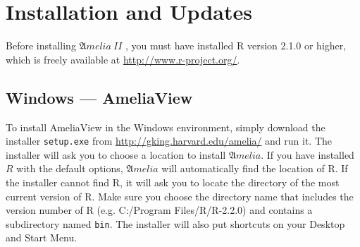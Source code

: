 \documentclass[12pt,titlepage]{article}
\newcommand{\AmeliaII}{\ensuremath{\mathfrak Amelia~II} }
\begin{document}

\section{Installation and Updates}
\label{sec:install}

Before installing \AmeliaII, you must have installed R version 2.1.0
or higher, which is freely available at
\url{http://www.r-project.org/}.  
\subsection{Windows --- AmeliaView}
\label{sec:win-install}
To install AmeliaView in the Windows environment, simply download the
installer \texttt{setup.exe} from
\url{http://gking.harvard.edu/amelia/} and run it.  The installer will
ask you to choose a location to install ${\mathfrak Amelia}$.  If you
have installed $R$ with the default options, ${\mathfrak Amelia}$ will
automatically find the location of R.  If the installer cannot find R,
it will ask you to locate the directory of the most current version of
R.  Make sure you choose the directory name that includes the version
number of R (e.g. C:/Program Files/R/R-2.2.0) and contains a
subdirectory named \texttt{bin}.  The installer will also put
shortcuts on your Desktop and Start Menu.
\end{document}
